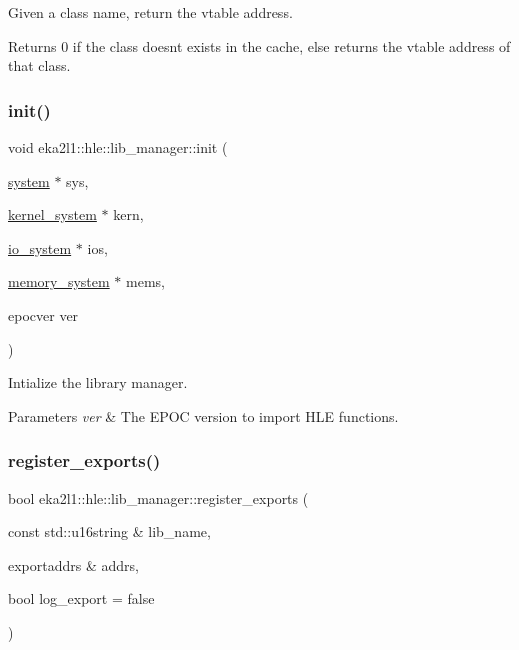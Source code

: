 Given a class name, return the vtable address. 

\begin{DoxyReturn}{Returns}
0 if the class doesn\textquotesingle{}t exists in the cache, else returns the vtable address of that class. 
\end{DoxyReturn}
\mbox{\label{classeka2l1_1_1hle_1_1lib__manager_a0def103095f212354c88c41f6746f90c}} 
\subsubsection{\texorpdfstring{init()}{init()}}
{\footnotesize\ttfamily void eka2l1\+::hle\+::lib\+\_\+manager\+::init (\begin{DoxyParamCaption}\item[{\mbox{\hyperlink{classeka2l1_1_1system}{system}} $\ast$}]{sys,  }\item[{\mbox{\hyperlink{classeka2l1_1_1kernel__system}{kernel\+\_\+system}} $\ast$}]{kern,  }\item[{\mbox{\hyperlink{classeka2l1_1_1io__system}{io\+\_\+system}} $\ast$}]{ios,  }\item[{\mbox{\hyperlink{classeka2l1_1_1memory__system}{memory\+\_\+system}} $\ast$}]{mems,  }\item[{epocver}]{ver }\end{DoxyParamCaption})}



Intialize the library manager. 


\begin{DoxyParams}{Parameters}
{\em ver} & The E\+P\+OC version to import H\+LE functions. \\
\hline
\end{DoxyParams}
\mbox{\label{classeka2l1_1_1hle_1_1lib__manager_a79eea8bce230c84310e191a03c3534a9}} 
\subsubsection{\texorpdfstring{register\+\_\+exports()}{register\_exports()}}
{\footnotesize\ttfamily bool eka2l1\+::hle\+::lib\+\_\+manager\+::register\+\_\+exports (\begin{DoxyParamCaption}\item[{const std\+::u16string \&}]{lib\+\_\+name,  }\item[{exportaddrs \&}]{addrs,  }\item[{bool}]{log\+\_\+export = {\ttfamily false} }\end{DoxyParamCaption})}



